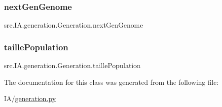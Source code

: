 \subsubsection{\texorpdfstring{next\+Gen\+Genome}{nextGenGenome}}
{\footnotesize\ttfamily src.\+I\+A.\+generation.\+Generation.\+next\+Gen\+Genome}

\mbox{\label{classsrc_1_1_i_a_1_1generation_1_1_generation_a289b8af8c8cf5a43f6938ac3da049be6}} 
\subsubsection{\texorpdfstring{taille\+Population}{taillePopulation}}
{\footnotesize\ttfamily src.\+I\+A.\+generation.\+Generation.\+taille\+Population}



The documentation for this class was generated from the following file\+:\begin{DoxyCompactItemize}
\item 
I\+A/\hyperlink{generation_8py}{generation.\+py}\end{DoxyCompactItemize}
